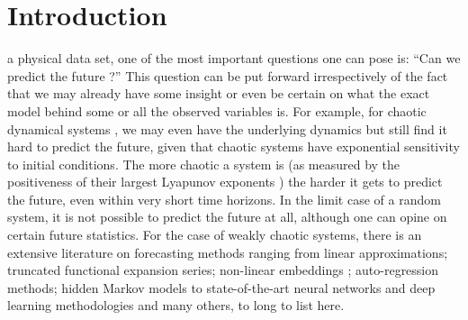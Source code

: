 \documentclass[journal]{IEEEtran}
\begin{document}
\section{Introduction}
%
%
%
%
 a physical data set, one of the most important questions one can pose is: ``Can we predict the future ?'' This 
question can be put forward irrespectively of the fact that we may already have some insight or even be certain on what the exact model 
behind some or all the observed variables is. For example, for chaotic dynamical systems \cite{0813340853,2004icti.book.....M}, we may 
even have the underlying dynamics but still find it hard to predict the future, given that chaotic systems have exponential sensitivity 
to initial conditions. The more chaotic a system is (as measured by the positiveness of their largest Lyapunov exponents 
\cite{1985PhyD...16..285W,1994PhLA..185...77K}) the harder it gets to predict the future, even within very short time horizons. In the 
limit case of a random system, it is not possible to predict the future at all, although one can opine on certain future 
statistics\cite{9780486693873}. For the case of weakly chaotic systems, there is an extensive literature on forecasting methods ranging 
from linear approximations\cite{1451722}; truncated functional expansion 
series\cite{Powell:1987:RBF:48424.48433,Broomhead1988MultivariableFI}; non-linear embeddings \cite{PhysRevLett.59.845}; auto-regression 
methods\cite{0130607746}; hidden Markov models \cite{1165342} to state-of-the-art neural networks and deep learning methodologies 
\cite{LANGKVIST201411} and many others, to long to list here.
\end{document}
